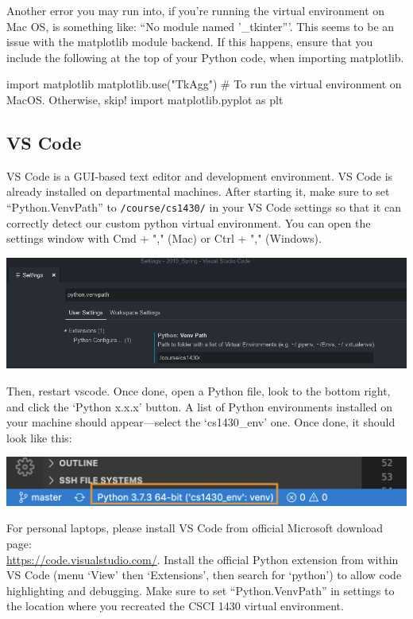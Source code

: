 \documentclass{article}
\begin{document}
Another error you may run into, if you're running the virtual environment on Mac OS, is something like: ``No module named '\_tkinter'''. This seems to be an issue with the matplotlib module backend. If this happens, ensure that you include the following at the top of your Python code, when importing matplotlib.
\begin{python}
import matplotlib
matplotlib.use("TkAgg") # To run the virtual environment on MacOS. Otherwise, skip!
import matplotlib.pyplot as plt
\end{python}

\subsection{VS Code}
VS Code is a GUI-based text editor and development environment. VS Code is already installed on departmental machines. After starting it, make sure to set ``Python.VenvPath'' to \texttt{/course/cs1430/} in your VS Code settings so that it can correctly detect our custom python virtual environment. You can open the settings window with Cmd + "," (Mac) or Ctrl + "," (Windows).

\includegraphics[width=\linewidth]{VenvPath.png}

Then, restart vscode. Once done, open a Python file, look to the bottom right, and click the `Python x.x.x' button. A list of Python environments installed on your machine should appear---select the `cs1430\_env' one. Once done, it should look like this:

\includegraphics[width=\linewidth]{VSCode_VenvCorrect.png}

For personal laptops, please install VS Code from official Microsoft download page:\\ \href{https://code.visualstudio.com/}{https://code.visualstudio.com/}. Install the official Python extension from within VS Code (menu `View' then `Extensions', then search for `python') to allow code highlighting and debugging. Make sure to set ``Python.VenvPath'' in settings to the location where you recreated the CSCI 1430 virtual environment.
\end{document}
